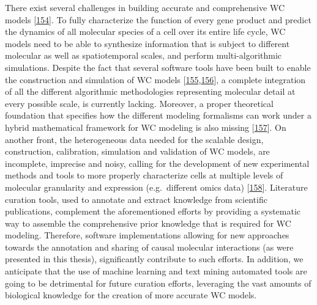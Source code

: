 \documentclass[
  12pt,
]{book}
\begin{document}
There exist several challenges in building accurate and comprehensive WC models {[}\protect\hyperlink{ref-whole-cell-doc}{154}{]}.
To fully characterize the function of every gene product and predict the dynamics of all molecular species of a cell over its entire life cycle, WC models need to be able to synthesize information that is subject to different molecular as well as spatiotemporal scales, and perform multi-algorithmic simulations.
Despite the fact that several software tools have been built to enable the construction and simulation of WC models {[}\protect\hyperlink{ref-Tomita1999}{155},\protect\hyperlink{ref-Blinov2017}{156}{]}, a complete integration of all the different algorithmic methodologies representing molecular detail at every possible scale, is currently lacking.
Moreover, a proper theoretical foundation that specifies how the different modeling formalisms can work under a hybrid mathematical framework for WC modeling is also missing {[}\protect\hyperlink{ref-Karr2015}{157}{]}.
On another front, the heterogeneous data needed for the scalable design, construction, calibration, simulation and validation of WC models, are incomplete, imprecise and noisy, calling for the development of new experimental methods and tools to more properly characterize cells at multiple levels of molecular granularity and expression (e.g.~different omics data) {[}\protect\hyperlink{ref-Macklin2020}{158}{]}.
Literature curation tools, used to annotate and extract knowledge from scientific publications, complement the aforementioned efforts by providing a systematic way to assemble the comprehensive prior knowledge that is required for WC modeling.
Therefore, software implementations allowing for new approaches towards the annotation and sharing of causal molecular interactions (as were presented in this thesis), significantly contribute to such efforts.
In addition, we anticipate that the use of machine learning and text mining automated tools are going to be detrimental for future curation efforts, leveraging the vast amounts of biological knowledge for the creation of more accurate WC models.
\end{document}
